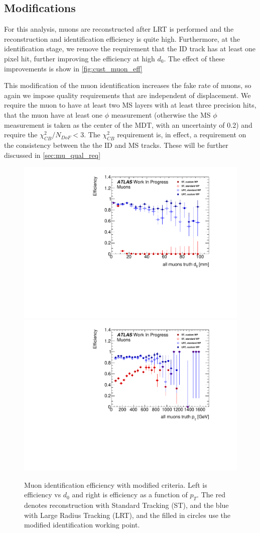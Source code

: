 \subsection{Modifications}

For this analysis, muons are reconstructed after \ac{LRT} is performed and the reconstruction and identification efficiency is quite high. Furthermore, at the identification stage, we remove the requirement that the \ac{ID} track has at least one pixel hit, further improving the efficiency at high $d_{0}$. The effect of these improvements is show in \autoref{fig:cust_muon_eff}


This modification of the muon identification increases the fake rate of muons, so again we impose quality requirements that are independent of displacement. We require the muon to have at least two \ac{MS} layers with at least three precision hits, that the muon have at least one $\phi$ measurement (otherwise the \ac{MS} $\phi$ measurement is taken as the center of the \ac{MDT}, with an uncertainty of 0.2) and require the $\chi^{2}_{CB}/N_{DoF} < 3$. The $\chi^{2}_{CB}$ requirement is, in effect, a requirement on the consistency between the the \ac{ID} and \ac{MS} tracks. These will be further discussed in \autoref{sec:mu_qual_req}


\begin{figure}[htbp]
\centering
\includegraphics[width=.48\textwidth]{figures/EventReconstruction/wp_m_d0_all_wip.pdf}
\includegraphics[width=.48\textwidth]{figures/EventReconstruction/wp_m_pt_all_wip.pdf}
\caption{Muon identification efficiency with modified criteria. Left is efficiency vs $d_{0}$ and right is efficiency as a function of $p_{T}$. The red denotes reconstruction with Standard Tracking (ST), and the blue with Large Radius Tracking (LRT), and the filled in circles use the modified identification working point. }
\label{fig:cust_muon_eff}
\end{figure}



